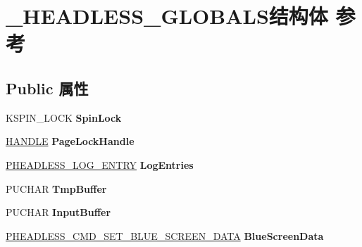 \hypertarget{struct___h_e_a_d_l_e_s_s___g_l_o_b_a_l_s}{}\section{\+\_\+\+H\+E\+A\+D\+L\+E\+S\+S\+\_\+\+G\+L\+O\+B\+A\+L\+S结构体 参考}
\label{struct___h_e_a_d_l_e_s_s___g_l_o_b_a_l_s}
\subsection*{Public 属性}
\begin{DoxyCompactItemize}
\item 
\mbox{\label{struct___h_e_a_d_l_e_s_s___g_l_o_b_a_l_s_aeb5badd2a931b159202fcd483609e9e7}} 
K\+S\+P\+I\+N\+\_\+\+L\+O\+CK {\bfseries Spin\+Lock}
\item 
\mbox{\label{struct___h_e_a_d_l_e_s_s___g_l_o_b_a_l_s_a93675591e31f938622f323a14cdb3153}} 
\hyperlink{interfacevoid}{H\+A\+N\+D\+LE} {\bfseries Page\+Lock\+Handle}
\item 
\mbox{\label{struct___h_e_a_d_l_e_s_s___g_l_o_b_a_l_s_a926204fdfd2a8fd1544231443b221fbd}} 
\hyperlink{struct___h_e_a_d_l_e_s_s___l_o_g___e_n_t_r_y}{P\+H\+E\+A\+D\+L\+E\+S\+S\+\_\+\+L\+O\+G\+\_\+\+E\+N\+T\+RY} {\bfseries Log\+Entries}
\item 
\mbox{\label{struct___h_e_a_d_l_e_s_s___g_l_o_b_a_l_s_ae1eb663ced0fa7a0f037f6243470486f}} 
P\+U\+C\+H\+AR {\bfseries Tmp\+Buffer}
\item 
\mbox{\label{struct___h_e_a_d_l_e_s_s___g_l_o_b_a_l_s_ad776b8667cdfe965aa0ac58b46b860c5}} 
P\+U\+C\+H\+AR {\bfseries Input\+Buffer}
\item 
\mbox{\label{struct___h_e_a_d_l_e_s_s___g_l_o_b_a_l_s_a20d7443b730726edd5d01e948b2443a6}} 
\hyperlink{struct___h_e_a_d_l_e_s_s___c_m_d___s_e_t___b_l_u_e___s_c_r_e_e_n___d_a_t_a}{P\+H\+E\+A\+D\+L\+E\+S\+S\+\_\+\+C\+M\+D\+\_\+\+S\+E\+T\+\_\+\+B\+L\+U\+E\+\_\+\+S\+C\+R\+E\+E\+N\+\_\+\+D\+A\+TA} {\bfseries Blue\+Screen\+Data}

\end{DoxyCompactItemize}
